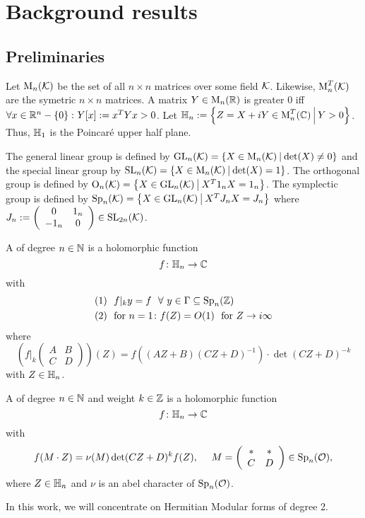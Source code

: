 
\section{Background results}

\subsection{Preliminaries}

Let $\operatorname{M}_n(\mathcal{K})$ be the set of all $n \times n$ matrices over some field $\mathcal{K}$.
Likewise, $\operatorname{M}_n^T(\mathcal{K})$ are the symetric $n \times n$ matrices.
A matrix $Y \in \operatorname{M}_n(\mathbb{R})$ is greater $0$ iff $\forall x \in \R^n - \Set{0} \colon Y[x] := x^T Y x > 0$.
Let $\HalfPlane_n := \Set{Z = X + iY \in \M_n^T(\C)}{Y > 0}$.
Thus, $\mathbb{H}_1$ is the Poincaré upper half plane.

The general linear group is defined by $\GL_n(\K) = \Set{X \in \M_n(\K)}{\det(X) \neq 0}$
and the special linear group by $\SL_n(\K) = \Set{X \in \M_n(\K)}{\det(X) = 1}$. %
The orthogonal group is defined by $\Orth_n(\K) = \Set{X \in \GL_n(\K)}{X^T 1_n X = 1_n}$. %
The symplectic group is defined by $\Sp_n(\K) = \Set{X \in \GL_n(\K)}{X^T J_n X = J_n}$ %
where $J_n := \left( \begin{array}{cc} 0 & 1_n \\ -1_n & 0 \end{array} \right) \in \operatorname{SL}_{2n}(\mathcal{K})$. %

A  of degree $n\in\mathbb{N}$ is a holomorphic function
\[ f \colon \mathbb{H}_n \rightarrow \mathbb{C} \]
with
\begin{align*}
(1) \ \ & f |_k y = f \ \ \forall \ y \in \Gamma \subseteq \operatorname{Sp}_n(\mathbb{Z}) \\
(2) \ \ & \text{for } n = 1 \colon f(Z) = O(1) \ \text{ for } Z \rightarrow i \infty
\end{align*}
where
\[ \left( f|_k \left( \begin{array}{ccc}
A & B \\
C & D \end{array} \right) \right) (Z) =
f((AZ + B)(CZ + D)^{-1}) \cdot \det(CZ + D)^{-k} \]
with $Z \in \mathbb{H}_n$.

A  of degree $n\in\mathbb{N}$ and weight $k\in \mathbb{Z}$ is a holomorphic function
\[ f \colon \mathbb{H}_n \rightarrow \mathbb{C} \]
with
\[ f(M \cdot Z) = \nu(M) \det(CZ + D)^k f(Z), \ \ \ \ M = \left( \begin{array}{cc} * & * \\ C & D \end{array} \right) \in \operatorname{Sp}_n(\mathcal{O}) , \]
where $Z \in \mathbb{H}_n$ and $\nu$ is an abel character of $\operatorname{Sp}_n(\mathcal{O})$.

In this work, we will concentrate on Hermitian Modular forms of degree 2.
